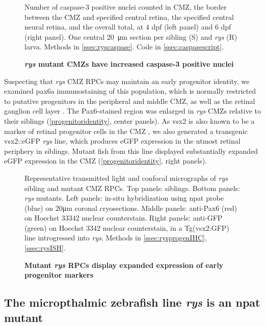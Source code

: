 \begin{figure}[!h]
    \caption{{\bf \textit{rys} mutant CMZs have increased caspase-3 positive nuclei}}
    Number of caspase-3 positive nuclei counted in CMZ, the border between the CMZ and specified central retina, the specified central neural retina, and the overall total, at 4 dpf (left panel) and 6 dpf (right panel). One central \SI{20}{\micro\metre} section per sibling (S) and \textit{rys} (R) larva.
    \label{caspase}
    Methods in \autoref{ssec:ryscaspase}.
    Code in \autoref{ssec:caspasescript}.
\end{figure}

Suspecting that \textit{rys} CMZ RPCs may maintain an early progenitor identity, we examined pax6a immunostaining of this population, which is normally restricted to putative progenitors in the peripheral and middle CMZ, as well as the retinal ganglion cell layer \cite{Raymond2006}. The Pax6-stained region was enlarged in \textit{rys} CMZs relative to their siblings (\autoref{progenitoridentity}, center panels). As vsx2 is also known to be a marker of retinal progenitor cells in the CMZ \cite{Raymond2006}, we also generated a transgenic vsx2::eGFP \textit{rys} line, which produces eGFP expression in the utmost retinal periphery in siblings. Mutant fish from this line displayed substantially expanded eGFP expression in the CMZ (\autoref{progenitoridentity}, right panels).

\begin{figure}[!h]
    \caption{{\bf Mutant \textit{rys} RPCs display expanded expression of early progenitor markers}}
    Representative transmitted light and confocal micrographs of \textit{rys} sibling and mutant CMZ RPCs. Top panels: siblings. Bottom panels: \textit{rys} mutants. Left panels: in-situ hybridization using npat probe (blue) on 20\si{\micro\metre} coronal cryosections. Middle panels: anti-Pax6 (red) on Hoechst 33342 nuclear counterstain. Right panels: anti-GFP (green) on Hoechst 3342 nuclear counterstain, in a Tg(vsx2:GFP) line introgressed into \textit{rys}. 
    Methods in \autoref{ssec:rysprogenIHC}, \autoref{ssec:rysISH}.
    \label{progenitoridentity}
\end{figure}

\FloatBarrier
\subsection{The micropthalmic zebrafish line \textit{rys} is an npat mutant}

